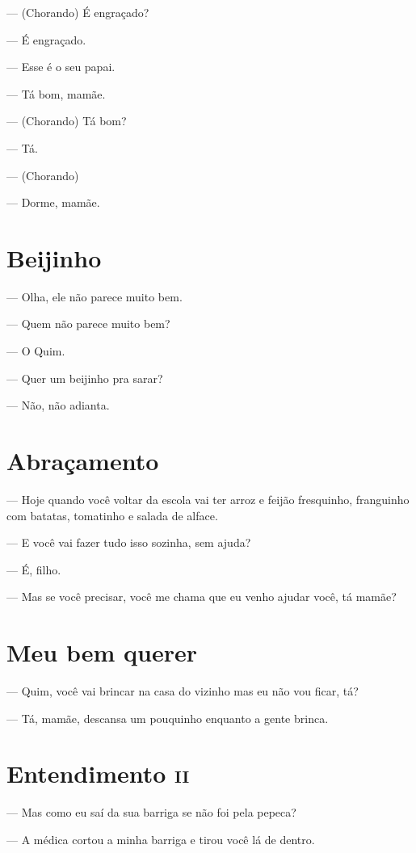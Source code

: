 {--- (Chorando) É engraçado?

--- É engraçado.

--- Esse é o seu papai.

--- Tá bom, mamãe.

--- (Chorando) Tá bom?

--- Tá.

--- (Chorando)

--- Dorme, mamãe.

\chapter{Beijinho}\label{beijinho}

--- Olha, ele não parece muito bem.

--- Quem não parece muito bem?

--- O Quim.

--- Quer um beijinho pra sarar?

--- Não, não adianta.

\chapter{Abraçamento}\label{abrauxe7amento}

--- Hoje quando você voltar da escola vai ter arroz e feijão fresquinho,
franguinho com batatas, tomatinho e salada de alface.

--- E você vai fazer tudo isso sozinha, sem ajuda?

--- É, filho.

--- Mas se você precisar, você me chama que eu venho ajudar você, tá
mamãe?

\chapter{Meu bem querer}\label{meu-bem-querer}

--- Quim, você vai brincar na casa do vizinho mas eu não vou ficar, tá?

--- Tá, mamãe, descansa um pouquinho enquanto a gente brinca.

\chapter{Entendimento \textsc{ii}}

--- Mas como eu saí da sua barriga se não foi pela pepeca?

--- A médica cortou a minha barriga e tirou você lá de dentro.

}
